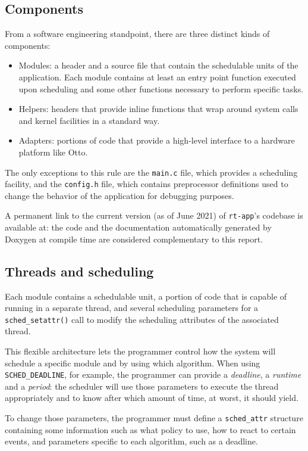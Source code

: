 \documentclass[a4paper,12pt]{report}
\begin{document}
\subsection{Components}

From a software engineering standpoint, there are three distinct kinds of components:
\begin{itemize}
    \item Modules: a header and a source file that contain the schedulable units of the application. Each module contains at least an entry point function executed upon scheduling and some other functions necessary to perform specific tasks.   
    \item Helpers: headers that provide inline functions that wrap around system calls and kernel facilities in a standard way.
    \item Adapters: portions of code that provide a high-level interface to a hardware platform like Otto.
\end{itemize}

The only exceptions to this rule are the \texttt{main.c} file, which provides a scheduling facility, and the \texttt{config.h} file, which contains preprocessor definitions used to change the behavior of the application for debugging purposes.

A permanent link to the current version (as of June 2021) of \texttt{rt-app}'s codebase is available at: the code and the documentation automatically generated by Doxygen at compile time are considered complementary to this report.

\subsection{Threads and scheduling}
Each module contains a schedulable unit, a portion of code that is capable of running in a separate thread, and several scheduling parameters for a \texttt{sched\_setattr()} call to modify the scheduling attributes of the associated thread.

This flexible architecture lets the programmer control how the system will schedule a specific module and by using which algorithm. When using \texttt{SCHED\_DEADLINE}, for example, the programmer can provide a \textit{deadline}, a \textit{runtime} and a \textit{period}: the scheduler will use those parameters to execute the thread appropriately and to know after which amount of time, at worst, it should yield.

To change those parameters, the programmer must define a \texttt{sched\_attr} structure containing some information such as what policy to use, how to react to certain events, and parameters specific to each algorithm, such as a deadline.
\end{document}
